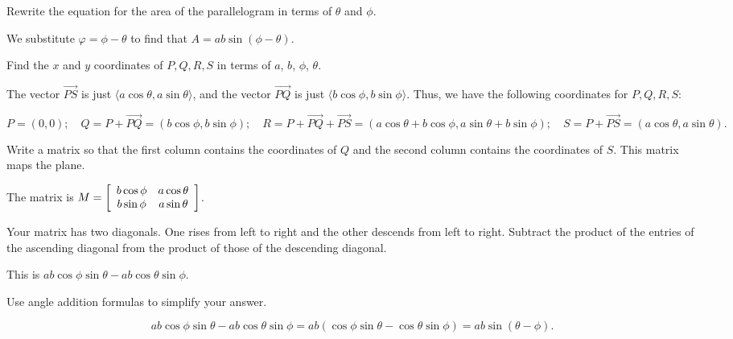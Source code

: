 \documentclass[../key.tex]{subfiles}
\begin{document}
\begin{inner_problem}[start=1]
\item Rewrite the equation for the area of the parallelogram in terms of $\theta$ and $\phi$.
\end{inner_problem}

We substitute $\varphi = \phi - \theta$ to find that $A = ab\sin(\phi - \theta)$.

\begin{inner_problem}
\item Find the $x$ and $y$ coordinates of $P,Q,R,S$ in terms of $a$, $b$, $\phi$, $\theta$.
\end{inner_problem}

The vector $\overrightarrow{PS}$ is just $\langle a\cos \theta, a\sin\theta \rangle$, and the vector $\overrightarrow{PQ}$ is just $\langle b\cos\phi, b\sin\phi \rangle$. Thus, we have the following coordinates for $P,Q,R,S$:

$$P = (0,0);\quad Q = P+\overrightarrow{PQ} = (b\cos\phi, b\sin\phi);\quad R = P+\overrightarrow{PQ}+\overrightarrow{PS} = (a\cos\theta + b\cos\phi, a\sin\theta + b\sin\phi);\quad S = P+\overrightarrow{PS} = (a\cos\theta, a\sin\theta).$$

\begin{inner_problem}
\item Write a matrix so that the first column contains the coordinates of $Q$ and the second column contains the coordinates of $S$. This matrix maps the plane.
\end{inner_problem}

The matrix is $M=\left[\begin{array}{cc} b\cos\phi & a\cos\theta \\ b\sin\phi & a\sin\theta \end{array}\right]$.

\begin{inner_problem}
\item Your matrix has two diagonals. One rises from left to right and the other descends from left to right. Subtract the product of the entries of the ascending diagonal from the product of those of the descending diagonal.
\end{inner_problem}

This is $ab\cos\phi\sin\theta - ab\cos\theta\sin\phi$.

\begin{inner_problem}
\item Use angle addition formulas to simplify your answer.
\end{inner_problem}

$$ab\cos\phi\sin\theta - ab\cos\theta\sin\phi = ab(\cos\phi\sin\theta - \cos\theta\sin\phi) = ab\sin(\theta-\phi).$$
\end{document}
